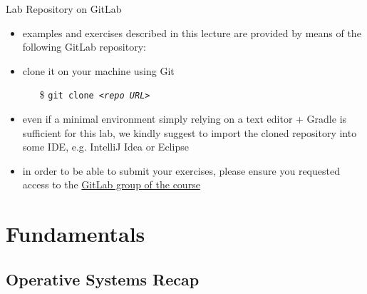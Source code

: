 \documentclass[presentation]{beamer}\mode<presentation>{\usetheme{AMSBolognaFC}}
\begin{document}
\begin{frame}[c]{Lab \labN{} Repository on GitLab}

	\begin{itemize}
		\item examples and exercises described in this lecture are provided by means of the following GitLab repository:
		\begin{center}
			\uurl{\labRepo}
		\end{center}

		\vfill

		\item clone it on your machine using Git
		\begin{itemize}
		    \item[\$] \texttt{git clone \textit{<repo URL>}}
		\end{itemize}

		\vfill

		\item even if a minimal environment simply relying on a text editor + Gradle is sufficient for this lab, we kindly suggest to import the cloned repository into some IDE, e.g. IntelliJ Idea or Eclipse

		\vfill

		\item in order to be able to submit your exercises, please ensure you requested access to the \href{\gitlabGroup}{GitLab group of the course}
	\end{itemize}

\end{frame}

\section{Fundamentals}

\subsection{Operative Systems Recap}
\end{document}

